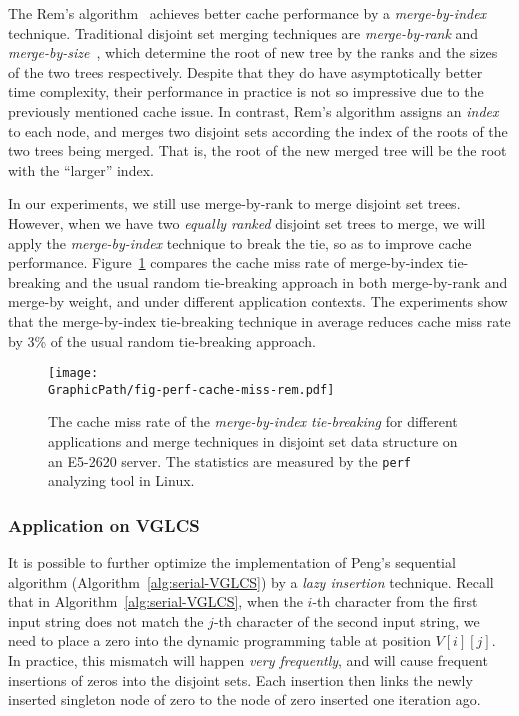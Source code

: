 The Rem's algorithm~\cite{dijkstra1976a} achieves better cache
performance by a {\em merge-by-index} technique.  Traditional disjoint
set merging techniques are {\em merge-by-rank} and {\em
  merge-by-size}~\cite{Tarjan1975EfficiencyOA}, which determine the
root of new tree by the ranks and the sizes of the two trees
respectively.  Despite that they do have asymptotically better time
complexity, their performance in practice is not so impressive due to
the previously mentioned cache issue.  In contrast, Rem's algorithm
assigns an {\em index} to each node, and merges two disjoint sets
according the index of the roots of the two trees being merged.  That
is, the root of the new merged tree will be the root with the
``larger'' index.

In our experiments, we still use merge-by-rank to merge disjoint set
trees.  However, when we have two {\em equally ranked} disjoint set
trees to merge, we will apply the {\em merge-by-index} technique to
break the tie, so as to improve cache performance.
Figure~\ref{fig:fig-perf-cache-miss-rem} compares the cache miss rate
of merge-by-index tie-breaking and the usual random tie-breaking
approach in both merge-by-rank and merge-by weight, and under
different application contexts.  The experiments show that the
merge-by-index tie-breaking technique in average reduces cache miss
rate by 3\% of the usual random tie-breaking approach.

\begin{figure}
  \centering
  \texttt{[image: \\GraphicPath/fig-perf-cache-miss-rem.pdf]}
  \caption{The cache miss rate of the {\em merge-by-index
      tie-breaking} for different applications and merge techniques in
    disjoint set data structure on an E5-2620 server.  The statistics
    are measured by the {\tt perf} analyzing tool in Linux.}
  \label{fig:fig-perf-cache-miss-rem}
\end{figure}

\subsubsection{Application on VGLCS}


It is possible to further optimize the implementation of Peng's
sequential algorithm (Algorithm~\ref{alg:serial-VGLCS}) by a {\em lazy
  insertion} technique.  Recall that in
Algorithm~\ref{alg:serial-VGLCS}, when the $i$-th character from the
first input string does not match the $j$-th character of the second
input string, we need to place a zero into the dynamic programming
table at position $V[i][j]$.  In practice, this mismatch will happen
{\em very frequently}, and will cause frequent insertions of zeros
into the disjoint sets.  Each insertion then links the newly inserted
singleton node of zero to the node of zero inserted one iteration ago.

